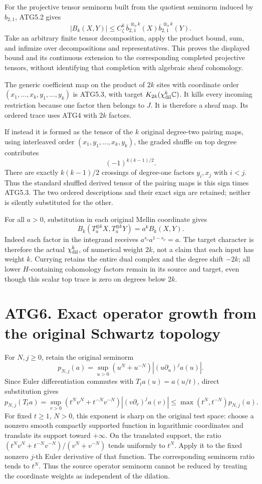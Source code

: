 For the projective tensor seminorm built from the quotient seminorm
induced by \(b_{2,1}\), ATG5.2 gives \[
\boxed{|B_k(X,Y)|\le C_\zeta^k\,
 \overline b_{2,1}^{\,\otimes_\pi k}(X)
 \overline b_{2,1}^{\,\otimes_\pi k}(Y).}
\tag{ATG5.5}
\] Take an arbitrary finite tensor decomposition, apply the product
bound, sum, and infimize over decompositions and representatives. This
proves the displayed bound and its continuous extension to the
corresponding completed projective tensors, without identifying that
completion with algebraic sheaf cohomology.

The generic coefficient map on the product of \(2k\) sites with
coordinate order \((x_1,\ldots,x_k,y_1,\ldots,y_k)\) is ATG5.3, with
target \(K_{2k}(\chi_{\rm dil}^k\mathbb C)\). It kills every incoming
restriction because one factor then belongs to \(J\). It is therefore a
sheaf map. Its ordered trace uses ATG4 with \(2k\) factors.

If instead it is formed as the tensor of the \(k\) original degree-two
pairing maps, using interleaved order \((x_1,y_1,\ldots,x_k,y_k)\), the
graded shuffle on top degree contributes \[
(-1)^{k(k-1)/2}.
\tag{ATG5.6}
\] There are exactly \(k(k-1)/2\) crossings of degree-one factors
\(y_i,x_j\) with \(i<j\). Thus the standard shuffled derived tensor of
the pairing maps is this sign times ATG5.3. The two ordered descriptions
and their exact sign are retained; neither is silently substituted for
the other.

For all \(a>0\), substitution in each original Mellin coordinate gives
\[
\boxed{B_k(T_a^{\otimes k}X,T_a^{\otimes k}Y)=a^k B_k(X,Y).}
\tag{ATG5.7}
\] Indeed each factor in the integrand receives
\(a^{s_\nu}a^{1-s_\nu}=a\). The target character is therefore the actual
\(\chi_{\rm dil}^k\), of numerical weight \(2k\), not a claim that each
input has weight \(k\). Currying retains the entire dual complex and the
degree shift \(-2k\); all lower \(H\)-containing cohomology factors
remain in its source and target, even though this scalar top trace is
zero on degrees below \(2k\).

\section{ATG6. Exact operator growth from the original Schwartz
topology}\label{atg6.-exact-operator-growth-from-the-original-schwartz-topology}

For \(N,j\ge0\), retain the original seminorm \[
p_{N,j}(a)=\sup_{u>0}(u^N+u^{-N})|(u\partial_u)^ja(u)|.
\] Since Euler differentiation commutes with \(T_ta(u)=a(u/t)\), direct
substitution gives \[
p_{N,j}(T_ta)
=\sup_{v>0}(t^Nv^N+t^{-N}v^{-N})|(v\partial_v)^ja(v)|
\le \max(t^N,t^{-N})p_{N,j}(a).
\tag{ATG6.1}
\] For fixed \(t\ge1\), \(N>0\), this exponent is sharp on the original
test space: choose a nonzero smooth compactly supported function in
logarithmic coordinates and translate its support toward \(+\infty\). On
the translated support, the ratio \((t^Nv^N+t^{-N}v^{-N})/(v^N+v^{-N})\)
tends uniformly to \(t^N\). Apply it to the fixed nonzero \(j\)-th Euler
derivative of that function. The corresponding seminorm ratio tends to
\(t^N\). Thus the source operator seminorm cannot be reduced by treating
the coordinate weights as independent of the dilation.

